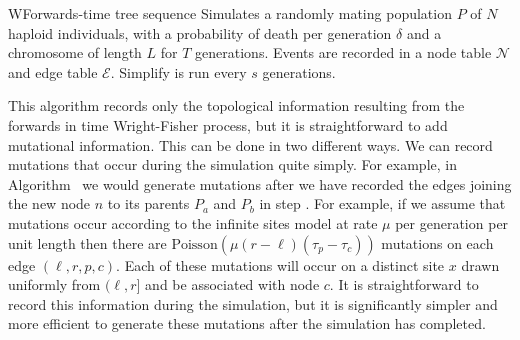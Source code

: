 \documentclass{article}
\begin{document}
\begin{taocpalg}{W}{Forwards-time tree sequence}
{Simulates a randomly mating population $P$ of $N$ haploid individuals,
with a probability of death per generation $\delta$ and a chromosome of length
$L$ for $T$ generations. Events are recorded in a node table $\mathcal{N}$
and edge table $\mathcal{E}$. Simplify is run every $s$ generations.
}




\algstep{W4.}{Mortality.}{ If $\randomuniform([0, 1)) \geq \delta$ go to \algref{W8}.
}


\algstep{W6.}{Choose parents.}{Set $a \leftarrow \randomuniform(\{0, \dots, N - 1\})$,
    $b \leftarrow \randomuniform(\{0, \dots, N - 1\})$ and $x \leftarrow \randomuniform([0, L))$.
}





\end{taocpalg}

This algorithm records only the topological information resulting from the
forwards in time Wright-Fisher process, but it is straightforward to add
mutational information. This can be done in two different ways.
We can record mutations that occur during the simulation quite simply.
For example, in Algorithm~ we would generate mutations after
we have recorded the edges joining the new node $n$ to its parents
$P_a$ and $P_b$ in step .
For example, if we assume that mutations occur according to the infinite sites model
at rate $\mu$ per generation per unit length then there are
$\mbox{Poisson}\left(\mu (r - \ell)(\tau_p
- \tau_c)\right)$ mutations on each edge $(\ell, r, p, c)$. Each of these mutations
will occur on a distinct site $x$ drawn uniformly from $(\ell, r]$ and be associated with node $c$.
It is straightforward to record this information during the simulation, but it
is significantly simpler and more efficient to generate these mutations
after the simulation has completed.
\end{document}
